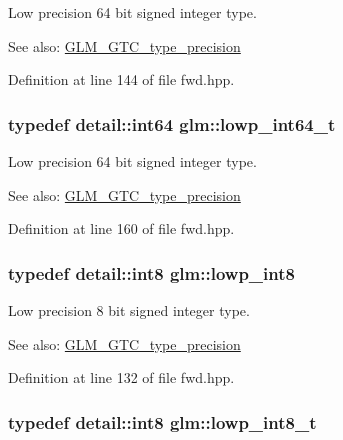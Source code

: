 Low precision 64 bit signed integer type. \begin{Desc}
\item[See also:]\hyperlink{group__gtc__type__precision}{GLM\_\-GTC\_\-type\_\-precision} \end{Desc}


Definition at line 144 of file fwd.hpp.\hypertarget{group__gtc__type__precision_g14d72e76d57c7f28eca8e933816c9fd6}{
\subsubsection[lowp\_\-int64\_\-t]{\setlength{\rightskip}{0pt plus 5cm}typedef detail::int64 {\bf glm::lowp\_\-int64\_\-t}}}
\label{group__gtc__type__precision_g14d72e76d57c7f28eca8e933816c9fd6}


Low precision 64 bit signed integer type. \begin{Desc}
\item[See also:]\hyperlink{group__gtc__type__precision}{GLM\_\-GTC\_\-type\_\-precision} \end{Desc}


Definition at line 160 of file fwd.hpp.\hypertarget{group__gtc__type__precision_gf9e675b6392764242ae87eb179e9d3d6}{
\subsubsection[lowp\_\-int8]{\setlength{\rightskip}{0pt plus 5cm}typedef detail::int8 {\bf glm::lowp\_\-int8}}}
\label{group__gtc__type__precision_gf9e675b6392764242ae87eb179e9d3d6}


Low precision 8 bit signed integer type. \begin{Desc}
\item[See also:]\hyperlink{group__gtc__type__precision}{GLM\_\-GTC\_\-type\_\-precision} \end{Desc}


Definition at line 132 of file fwd.hpp.\hypertarget{group__gtc__type__precision_ge6092311f6970a305c2df19a372360a3}{
\subsubsection[lowp\_\-int8\_\-t]{\setlength{\rightskip}{0pt plus 5cm}typedef detail::int8 {\bf glm::lowp\_\-int8\_\-t}}}
\label{group__gtc__type__precision_ge6092311f6970a305c2df19a372360a3}


